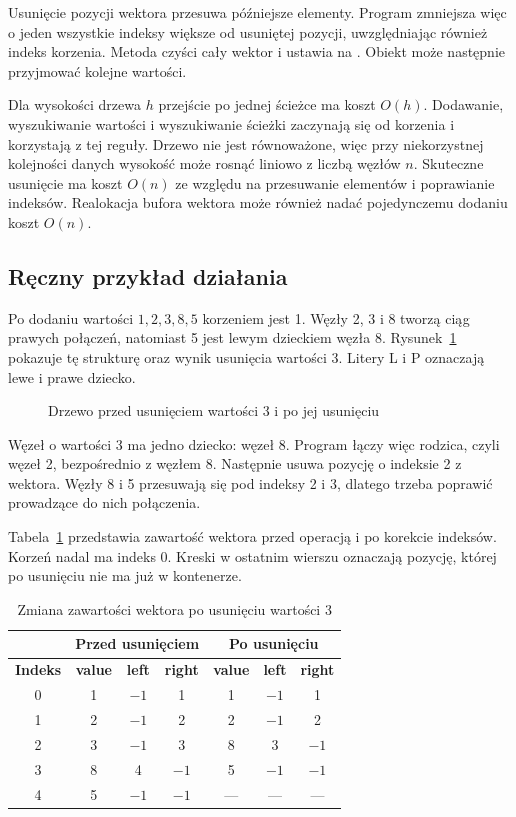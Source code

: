 Usunięcie pozycji wektora przesuwa późniejsze elementy.
Program zmniejsza więc o jeden wszystkie indeksy większe od
usuniętej pozycji, uwzględniając również indeks korzenia.
Metoda  czyści cały wektor i ustawia
 na . Obiekt może następnie przyjmować
kolejne wartości.

Dla wysokości drzewa $h$ przejście po jednej ścieżce ma koszt $O(h)$.
Dodawanie, wyszukiwanie wartości i wyszukiwanie ścieżki zaczynają się
od korzenia i korzystają z tej reguły. Drzewo nie jest równoważone,
więc przy niekorzystnej kolejności danych
wysokość może rosnąć liniowo z liczbą węzłów $n$.
Skuteczne usunięcie ma koszt $O(n)$ ze względu na przesuwanie
elementów i poprawianie indeksów. Realokacja bufora wektora
może również nadać pojedynczemu dodaniu koszt $O(n)$.

\subsection{Ręczny przykład działania}
\label{sec:przyklad-reczny}

Po dodaniu wartości $1,2,3,8,5$ korzeniem jest 1.
Węzły 2, 3 i 8 tworzą ciąg prawych połączeń, natomiast
5 jest lewym dzieckiem węzła 8.
Rysunek~\ref{rys:przyklad-bst} pokazuje tę strukturę
oraz wynik usunięcia wartości 3. Litery L i P oznaczają
lewe i prawe dziecko.

\begin{figure}[H]
\centering

\caption{Drzewo przed usunięciem wartości 3 i po jej usunięciu}
\label{rys:przyklad-bst}
\end{figure}

Węzeł o wartości 3 ma jedno dziecko: węzeł 8.
Program łączy więc rodzica, czyli węzeł 2, bezpośrednio z węzłem 8.
Następnie usuwa pozycję o indeksie 2 z wektora.
Węzły 8 i 5 przesuwają się pod indeksy 2 i 3,
dlatego trzeba poprawić prowadzące do nich połączenia.

Tabela~\ref{tab:zmiana-indeksow} przedstawia zawartość wektora
przed operacją i po korekcie indeksów. Korzeń nadal ma indeks 0.
Kreski w ostatnim wierszu oznaczają pozycję, której po usunięciu
nie ma już w kontenerze.

\begin{table}[H]
\centering
\caption{Zmiana zawartości wektora po usunięciu wartości 3}
\label{tab:zmiana-indeksow}
\small
\begin{tabular}{|c|c|c|c|c|c|c|}
\hline
& \multicolumn{3}{c|}{\textbf{Przed usunięciem}}
& \multicolumn{3}{c|}{\textbf{Po usunięciu}}\\ \hline
\textbf{Indeks} & \textbf{value} & \textbf{left} & \textbf{right}
& \textbf{value} & \textbf{left} & \textbf{right}\\ \hline
0 & 1 & $-1$ & 1 & 1 & $-1$ & 1\\ \hline
1 & 2 & $-1$ & 2 & 2 & $-1$ & 2\\ \hline
2 & 3 & $-1$ & 3 & 8 & 3 & $-1$\\ \hline
3 & 8 & 4 & $-1$ & 5 & $-1$ & $-1$\\ \hline
4 & 5 & $-1$ & $-1$ & --- & --- & ---\\ \hline
\end{tabular}
\end{table}

